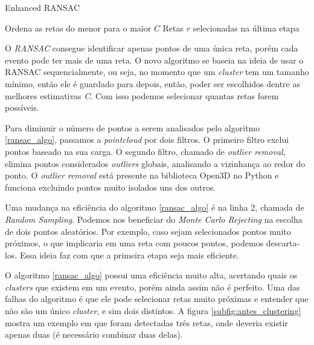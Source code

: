 \documentclass[a4paper,12pt,oneside]{book}
\begin{document}
\begin{algorithm}
    \caption{Enhanced RANSAC}\label{ransac_algo}
    Ordena as retas do menor para o maior $C$\;
    \Return Retas $r$ selecionadas na última etapa\;
\end{algorithm}

\par O \textit{RANSAC} consegue identificar apenas pontos de uma única reta, porém cada evento pode ter mais de uma reta. O novo algoritmo se baseia na ideia de usar o RANSAC sequencialmente, ou seja, no momento que um \textit{cluster} tem um tamanho mínimo, então ele é guardado para depois, então, poder ser escolhidos dentre as melhores estimativas \textit{C}. Com isso podemos selecionar quantas retas forem possíveis.

\par Para diminuir o número de pontos a serem analisados pelo algoritmo \ref{ransac_algo}, passamos a \textit{pointcloud} por dois filtros. O primeiro filtro exclui pontos baseado na sua carga. O segundo filtro, chamado de \textit{outlier removal}, elimina pontos considerados \textit{outliers} globais, analisando a vizinhança ao redor do ponto. O \textit{outlier removal} está presente na biblioteca Open3D\cite{open3d} no Python e funciona excluindo pontos muito isolados uns dos outros.

\par Uma mudança na eficiência do algoritmo \ref{ransac_algo} é na linha 2, chamada de \textit{Random Sampling}. Podemos nos beneficiar do \textit{Monte Carlo Rejecting} na escolha de dois pontos aleatórios. Por exemplo, caso sejam selecionados pontos muito próximos, o que implicaria em uma reta com poucos pontos, podemos descarta-los. Essa ideia faz com que a primeira etapa seja mais eficiente.

\par O algoritmo \ref{ransac_algo} possui uma eficiência muito alta, acertando quais os \textit{clusters} que existem em um evento, porém ainda assim não é perfeito. Uma das falhas do algoritmo é que ele pode selecionar retas muito próximas e entender que não são um único \textit{cluster}, e sim dois distintos. A figura \ref{subfig:antes_clustering} mostra um exemplo em que foram detectadas três retas, onde deveria existir apenas duas (é necessário combinar duas delas).
\end{document}
